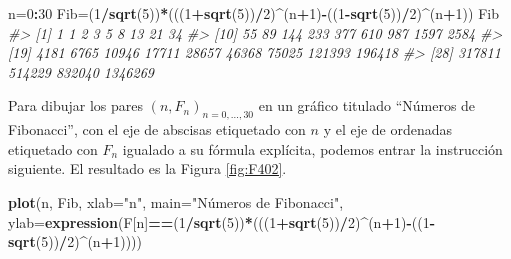 \documentclass[
]{book}
\newenvironment{Shaded}{\begin{snugshade}}{\end{snugshade}}
\newcommand{\CommentTok}[1]{\textcolor[rgb]{0.56,0.35,0.01}{\textit{#1}}}
\newcommand{\DataTypeTok}[1]{\textcolor[rgb]{0.13,0.29,0.53}{#1}}
\newcommand{\DecValTok}[1]{\textcolor[rgb]{0.00,0.00,0.81}{#1}}
\newcommand{\KeywordTok}[1]{\textcolor[rgb]{0.13,0.29,0.53}{\textbf{#1}}}
\newcommand{\NormalTok}[1]{#1}
\newcommand{\OperatorTok}[1]{\textcolor[rgb]{0.81,0.36,0.00}{\textbf{#1}}}
\newcommand{\StringTok}[1]{\textcolor[rgb]{0.31,0.60,0.02}{#1}}
\theoremstyle{definition}
\theoremstyle{definition}
\theoremstyle{definition}
\theoremstyle{remark}
\begin{document}
\begin{Shaded}
\begin{Highlighting}[]
\NormalTok{n=}\DecValTok{0}\OperatorTok{:}\DecValTok{30}
\NormalTok{Fib=(}\DecValTok{1}\OperatorTok{/}\KeywordTok{sqrt}\NormalTok{(}\DecValTok{5}\NormalTok{))}\OperatorTok{*}\NormalTok{(((}\DecValTok{1}\OperatorTok{+}\KeywordTok{sqrt}\NormalTok{(}\DecValTok{5}\NormalTok{))}\OperatorTok{/}\DecValTok{2}\NormalTok{)}\OperatorTok{\^{}}\NormalTok{(n}\OperatorTok{+}\DecValTok{1}\NormalTok{)}\OperatorTok{{-}}\NormalTok{((}\DecValTok{1}\OperatorTok{{-}}\KeywordTok{sqrt}\NormalTok{(}\DecValTok{5}\NormalTok{))}\OperatorTok{/}\DecValTok{2}\NormalTok{)}\OperatorTok{\^{}}\NormalTok{(n}\OperatorTok{+}\DecValTok{1}\NormalTok{))}
\NormalTok{Fib}
\CommentTok{\#\textgreater{}  [1]       1       1       2       3       5       8      13      21      34}
\CommentTok{\#\textgreater{} [10]      55      89     144     233     377     610     987    1597    2584}
\CommentTok{\#\textgreater{} [19]    4181    6765   10946   17711   28657   46368   75025  121393  196418}
\CommentTok{\#\textgreater{} [28]  317811  514229  832040 1346269}
\end{Highlighting}
\end{Shaded}

Para dibujar los pares \((n, F_n)_{n=0, \ldots, 30}\) en un gráfico titulado ``Números de Fibonacci'', con el eje de abscisas etiquetado con \(n\) y el eje de ordenadas etiquetado con \(F_n\) igualado a su fórmula explícita, podemos entrar la instrucción siguiente. El resultado es la Figura \ref{fig:F402}.

\begin{Shaded}
\begin{Highlighting}[]
\KeywordTok{plot}\NormalTok{(n, Fib, }\DataTypeTok{xlab=}\StringTok{"n"}\NormalTok{, }\DataTypeTok{main=}\StringTok{"Números de Fibonacci"}\NormalTok{, }
  \DataTypeTok{ylab=}\KeywordTok{expression}\NormalTok{(F[n]}\OperatorTok{==}\NormalTok{(}\DecValTok{1}\OperatorTok{/}\KeywordTok{sqrt}\NormalTok{(}\DecValTok{5}\NormalTok{))}\OperatorTok{*}\NormalTok{(((}\DecValTok{1}\OperatorTok{+}\KeywordTok{sqrt}\NormalTok{(}\DecValTok{5}\NormalTok{))}\OperatorTok{/}\DecValTok{2}\NormalTok{)}\OperatorTok{\^{}}\NormalTok{(n}\OperatorTok{+}\DecValTok{1}\NormalTok{)}\OperatorTok{{-}}\NormalTok{((}\DecValTok{1}\OperatorTok{{-}}\KeywordTok{sqrt}\NormalTok{(}\DecValTok{5}\NormalTok{))}\OperatorTok{/}\DecValTok{2}\NormalTok{)}\OperatorTok{\^{}}\NormalTok{(n}\OperatorTok{+}\DecValTok{1}\NormalTok{))))}
\end{Highlighting}
\end{Shaded}
\end{document}
